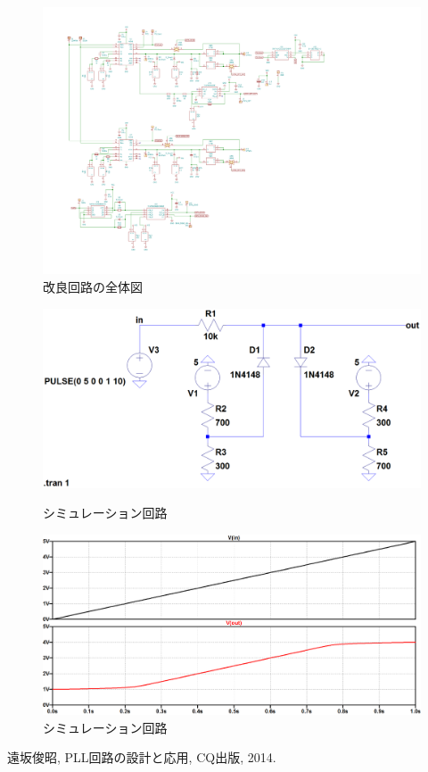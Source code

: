 \documentclass[twocolumn]{jsarticle}
\begin{document}
\begin{figure}[p]
\begin{center}

\includegraphics[width=180mm]{figures/wpf12_circuit.pdf}
\caption{改良回路の全体図}

\end{center}
\end{figure}
\begin{figure}[p]
\begin{center}

\includegraphics[width=160mm]{figures/circuit.png}
\caption{シミュレーション回路}

\vspace{1cm}
\includegraphics[width=160mm]{figures/result.png}
\caption{シミュレーション回路}

\end{center}
\end{figure}


\begin{thebibliography}{9}
 遠坂俊昭, PLL回路の設計と応用, CQ出版, 2014.
\end{thebibliography}
\end{document}
